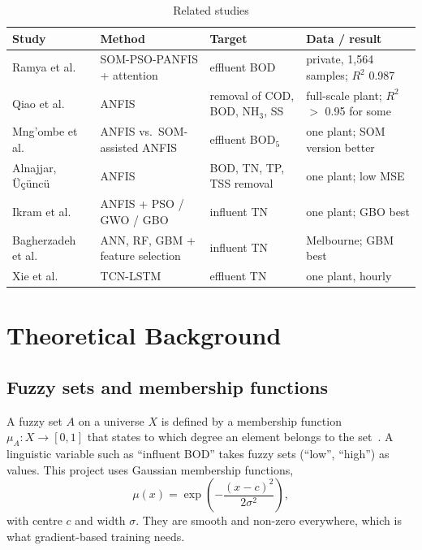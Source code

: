 \documentclass[conference]{IEEEtran}
\newcommand{\Rsq}{$R^2$}
\begin{document}
\begin{table}[t]
\caption{Related studies}
\label{tab:related}
\centering
\footnotesize
\begin{tabular}{p{1.55cm}p{2.2cm}p{1.6cm}p{1.9cm}}
\toprule
Study & Method & Target & Data / result \\
\midrule
Ramya et al.~\cite{ramya2025} & SOM-PSO-PANFIS + attention & effluent BOD & private, 1,564 samples; \Rsq{} 0.987 \\
Qiao et al.~\cite{qiao2023} & ANFIS & removal of COD, BOD, NH$_3$, SS & full-scale plant; \Rsq{} $>$ 0.95 for some \\
Mng'ombe et al.~\cite{mngombe2024} & ANFIS vs.\ SOM-assisted ANFIS & effluent BOD$_5$ & one plant; SOM version better \\
Alnajjar, \"U\c{c}\"unc\"u~\cite{alnajjar2022} & ANFIS & BOD, TN, TP, TSS removal & one plant; low MSE \\
Ikram et al.~\cite{ikram2024} & ANFIS + PSO / GWO / GBO & influent TN & one plant; GBO best \\
Bagherzadeh et al.~\cite{bagherzadeh2021} & ANN, RF, GBM + feature selection & influent TN & Melbourne; GBM best \\
Xie et al.~\cite{xie2024} & TCN-LSTM & effluent TN & one plant, hourly \\
\bottomrule
\end{tabular}
\end{table}

\section{Theoretical Background}
\subsection{Fuzzy sets and membership functions}
A fuzzy set $A$ on a universe $X$ is defined by a membership function $\mu_A: X \rightarrow [0,1]$ that states to which degree an element belongs to the set~\cite{zadeh1965}. A linguistic variable such as ``influent BOD'' takes fuzzy sets (``low'', ``high'') as values. This project uses Gaussian membership functions,
\begin{equation}
\mu(x) = \exp\!\left(-\frac{(x-c)^2}{2\sigma^2}\right),
\label{eq:gauss}
\end{equation}
with centre $c$ and width $\sigma$. They are smooth and non-zero everywhere, which is what gradient-based training needs.
\end{document}
